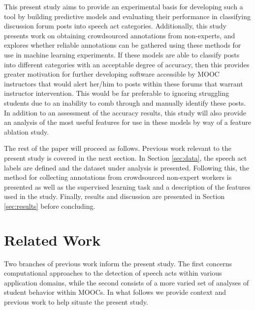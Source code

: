 \documentclass[twoside]{article}
\begin{document}
\par
This present study aims to provide an experimental basis for developing such a tool by building predictive models and evaluating their performance in classifying discussion forum posts into speech act categories. Additionally, this study presents work on obtaining crowdsourced annotations from non-experts, and explores whether reliable annotations can be gathered using these methods for use in machine learning experiments. If these models are able to classify posts into different categories with an acceptable degree of accuracy, then this provides greater motivation for further developing software accessible by MOOC instructors that would alert her/him to posts within these forums that warrant instructor intervention. This would be far preferable to ignoring struggling students due to an inability to comb through and manually identify these posts. In addition to an assessment of the accuracy results, this study will also provide an analysis of the most useful features for use in these models by way of a feature ablation study. 
\par
The rest of the paper will proceed as follows. Previous work relevant to the present study is covered in the next section. In Section \ref{sec:data}, the speech act labels are defined and the dataset under analysis is presented. Following this, the method for collecting annotations from crowdsourced non-expert workers is presented as well as the supervised learning task and a description of the features used in the study. Finally, results and discussion are presented in Section \ref{sec:results} before concluding.

\section{Related Work}
Two branches of previous work inform the present study. The first concerns computational approaches to the detection of speech acts within various application domains, while the second consists of a more varied set of analyses of student behavior within MOOCs. In what follows we provide context and previous work to help situate the present study.
\end{document}
